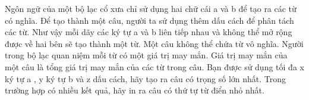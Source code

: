 Ngôn ngữ của một bộ lạc cổ xưa chỉ sử dụng hai chữ cái a và b để tạo ra các từ có nghĩa. Để tạo thành một câu, người ta sử dụng thêm dấu cách để phân tách các từ. Như vậy mỗi dãy các ký tự a và b liên tiếp nhau và không thể mở rộng được về hai bên sẽ tạo thành một từ. Một câu không thể chứa từ vô nghĩa. Người trong bộ lạc quan niệm mỗi từ có một giá trị may mắn. Giá trị may mắn của một câu là tổng giá trị may mắn của các từ trong câu. Bạn được sử dụng tối đa x ký tự a , y ký tự b và z dấu cách, hãy tạo ra câu có trọng số lớn nhất. Trong trường hợp có nhiều kết quả, hãy in ra câu có thứ tự từ điển nhỏ nhất.